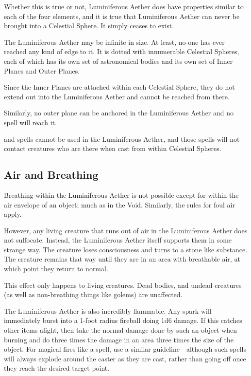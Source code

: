 \begin{multicols*}{2}
Whether this is true or not, Luminiferous Aether does have properties similar to each of the four elements, and it is true that Luminiferous Aether can never be brought into a Celestial Sphere. It simply ceases to exist.

The Luminiferous Aether may be infinite in size. At least, no-one has ever reached any kind of edge to it. It is dotted with innumerable Celestial Spheres, each of which has its own set of astronomical bodies and its own set of Inner Planes and Outer Planes.

Since the Inner Planes are attached within each Celestial Sphere, they do not extend out into the Luminiferous Aether and cannot be reached from there.

Similarly, no outer plane can be anchored in the Luminiferous Aether and no  spell will reach it.

 and  spells cannot be used in the Luminiferous Aether, and those spells will not contact creatures who are there when cast from within Celestial Spheres.

\subsection{Air and Breathing}
Breathing within the Luminiferous Aether is not possible except for within the air envelope of an object; much as in the Void. Similarly, the rules for foul air apply.

However, any living creature that runs out of air in the Luminiferous Aether does not suffocate. Instead, the Luminiferous Aether itself supports them in some strange way. The creature loses consciousness and turns to a stone like substance. The creature remains that way until they are in an area with breathable air, at which point they return to normal.

This effect only happens to living creatures. Dead bodies, and undead creatures (as well as non-breathing things like golems) are unaffected.

The Luminiferous Aether is also incredibly flammable. Any spark will immediately burst into a 1-foot radius fireball doing 1d6 damage. If this catches other items alight, then take the normal damage done by such an object when burning and do three times the damage in an area three times the size of the object. For magical fires like a  spell, use a similar guideline—although such spells will always explode around the caster as they are cast, rather than going off once they reach the desired target point.


\end{multicols*}
